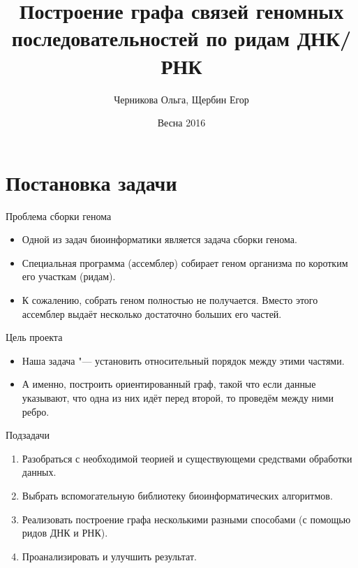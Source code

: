 \documentclass{beamer}
\title[Граф по ридам ДНК/РНК]{Построение графа связей геномных последовательностей по ридам ДНК/РНК}
\author{Черникова Ольга, Щербин Егор}
\institute{СПб АУ РАН}
\date{Весна 2016}
\newcommand{\cimg}[2]{%
	\begin{center}%
		\ifthenelse{\equal{#2}{}}{%
			\texttt{[image: \#1]}
		}{%
			\texttt{[image: \#1]}
		}%
	\end{center}%
}
\begin{document}
\begin{frame}
	\titlepage
\end{frame}

\section{Постановка задачи}

\begin{frame}[t]{Проблема сборки генома}
    \begin{itemize}
    \item
        Одной из задач биоинформатики является задача сборки генома.
    \item
        Специальная программа (ассемблер) собирает геном организма по коротким
        его участкам (ридам).
    \item
        К сожалению, собрать геном полностью не получается. Вместо этого
        ассемблер выдаёт несколько достаточно больших его частей.
    \end{itemize}
\end{frame}

\begin{frame}[t]{Цель проекта}
    \begin{itemize}
    \item
        Наша задача "--- установить относительный порядок между этими частями.
    \item
        А именно, построить ориентированный граф, такой что если данные 
        указывают, что одна из них идёт перед второй, то проведём между ними 
        ребро.
    \end{itemize}

    \cimg{1.jpg}{1}

\end{frame}

\begin{frame}[t]{Подзадачи}
	\begin{enumerate}
    \item
        Разобраться с необходимой теорией и существующеми средствами обработки
        данных.
    \item
        Выбрать вспомогательную библиотеку биоинформатических алгоритмов.
    \item
        Реализовать построение графа несколькими разными способами (с помощью 
        ридов ДНК и РНК).
    \item
        Проанализировать и улучшить результат.
	\end{enumerate}
\end{frame}
\end{document}
